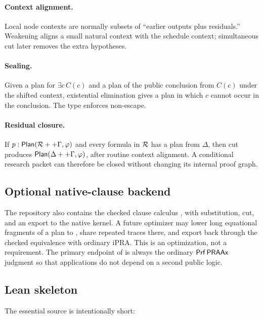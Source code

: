 \paragraph{Context alignment.}
Local node contexts are normally subsets of ``earlier outputs plus residuals.''  Weakening aligns a
small natural context with the schedule context; simultaneous cut later removes the extra hypotheses.

\paragraph{Sealing.}
Given a plan for \(\exists c\,C(c)\) and a plan of the public conclusion from \(C(c)\) under the
shifted context, existential elimination gives a plan in which \(c\) cannot occur in the conclusion.
The type enforces non-escape.

\paragraph{Residual closure.}
If \(p:\mathsf{Plan}(\mathcal R++\Gamma,\varphi)\) and every formula in \(\mathcal R\) has a plan from \(\Delta\),
then cut produces \(\mathsf{Plan}(\Delta++\Gamma,\varphi)\), after routine context alignment.  A conditional
research packet can therefore be closed without changing its internal proof graph.

\subsection{Optional native-clause backend}

The repository also contains the checked clause calculus , with substitution, cut, and an
export to the native kernel.  A future optimizer may lower long equational fragments of a plan to
, share repeated traces there, and export back through the checked equivalence with
ordinary iPRA.  This is an optimization, not a requirement.  The primary endpoint of \TAPIR{} is
always the ordinary \(\mathsf{Prf}\,\mathsf{PRAAx}\) judgment so that applications do not depend on a second public
logic.

\subsection{Lean skeleton}

The essential source is intentionally short:

